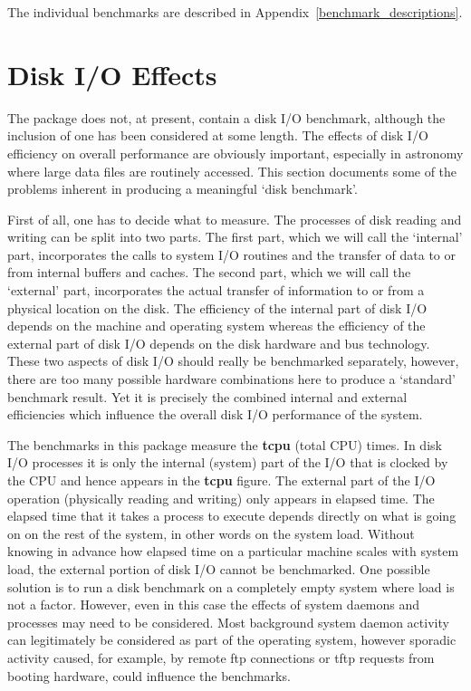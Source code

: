 The individual benchmarks are described in Appendix~\ref{benchmark_descriptions}.


\section{Disk I/O Effects}
\label{diskeffects}

The package does not, at present, contain a disk I/O benchmark,
although the inclusion of one has been considered at some length. The
effects of disk I/O efficiency on overall performance are obviously
important, especially in astronomy where large data files are routinely
accessed. This section documents some of the problems inherent in
producing a meaningful `disk benchmark'.

First of all, one has to decide what to measure. The processes of disk
reading and writing can be split into two parts. The first part, which
we will call the `internal' part, incorporates the calls to system I/O
routines and the transfer of data to or from internal buffers and
caches. The second part, which we will call the `external' part,
incorporates the actual transfer of information to or from a physical
location on the disk. The efficiency of the internal part of disk I/O
depends on the machine and operating system whereas the efficiency of
the external part of disk I/O depends on the disk hardware and bus
technology. These two aspects of disk I/O should really be benchmarked
separately, however, there are too many possible hardware combinations
here to produce a `standard' benchmark result.  Yet it is precisely the
combined internal and external efficiencies which influence the overall
disk I/O performance of the system.

The benchmarks in this package measure the {\bf tcpu} (total CPU)
times. In disk I/O processes it is only the internal (system) part of
the I/O that is clocked by the CPU and hence appears in the {\bf tcpu}
figure. The external part of the I/O operation (physically reading and
writing) only appears in elapsed time. The elapsed time that it takes a
process to execute depends directly on what is going on on the rest of
the system, in other words on the system load.  Without knowing in
advance how elapsed time on a particular machine scales with system
load, the external portion of disk I/O cannot be benchmarked. One
possible solution is to run a disk benchmark on a completely empty
system where load is not a factor. However, even in this case the
effects of system daemons and processes may need to be considered.
Most background system daemon activity can legitimately be considered
as part of the operating system, however sporadic activity caused, for
example, by remote ftp connections or tftp requests from booting
hardware, could influence the benchmarks.

